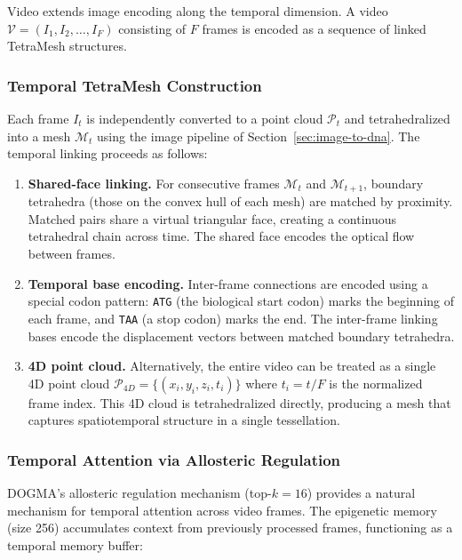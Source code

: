 Video extends image encoding along the temporal dimension. A video $\mathcal{V} = (I_1, I_2, \ldots, I_F)$ consisting of $F$ frames is encoded as a sequence of linked TetraMesh structures.

\subsubsection{Temporal TetraMesh Construction}

Each frame $I_t$ is independently converted to a point cloud $\mathcal{P}_t$ and tetrahedralized into a mesh $\mathcal{M}_t$ using the image pipeline of Section~\ref{sec:image-to-dna}. The temporal linking proceeds as follows:

\begin{enumerate}[leftmargin=1.8em]
  \item \textbf{Shared-face linking.} For consecutive frames $\mathcal{M}_t$ and $\mathcal{M}_{t+1}$, boundary tetrahedra (those on the convex hull of each mesh) are matched by proximity. Matched pairs share a virtual triangular face, creating a continuous tetrahedral chain across time. The shared face encodes the optical flow between frames.

  \item \textbf{Temporal base encoding.} Inter-frame connections are encoded using a special codon pattern: \texttt{ATG} (the biological start codon) marks the beginning of each frame, and \texttt{TAA} (a stop codon) marks the end. The inter-frame linking bases encode the displacement vectors between matched boundary tetrahedra.

  \item \textbf{4D point cloud.} Alternatively, the entire video can be treated as a single 4D point cloud $\mathcal{P}_{4D} = \{(x_i, y_i, z_i, t_i)\}$ where $t_i = t / F$ is the normalized frame index. This 4D cloud is tetrahedralized directly, producing a mesh that captures spatiotemporal structure in a single tessellation.
\end{enumerate}

\subsubsection{Temporal Attention via Allosteric Regulation}

DOGMA's allosteric regulation mechanism (top-$k=16$) provides a natural mechanism for temporal attention across video frames. The epigenetic memory (size 256) accumulates context from previously processed frames, functioning as a temporal memory buffer:

